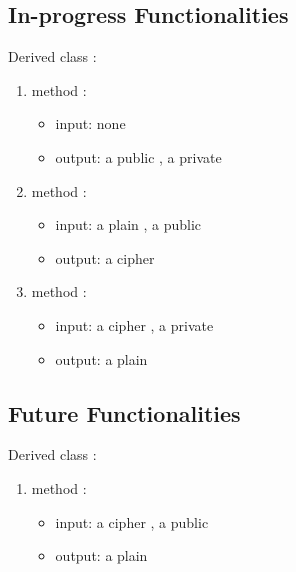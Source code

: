 \subsection{In-progress Functionalities}
Derived class :
\begin{enumerate}
\item method :
  \begin{itemize}
  \item input: none
  \item output: a public , a private 
  \end{itemize}
\item method :
  \begin{itemize}
  \item input: a plain , a public 
  \item output: a cipher 
  \end{itemize}
\item method :
  \begin{itemize}
  \item input: a cipher , a private 
  \item output: a plain 
  \end{itemize}
\end{enumerate}

\subsection{Future Functionalities}
Derived class :
\begin{enumerate}
\item method :
  \begin{itemize}
  \item input: a cipher , a public 
  \item output: a plain 
  \end{itemize}
\end{enumerate}
